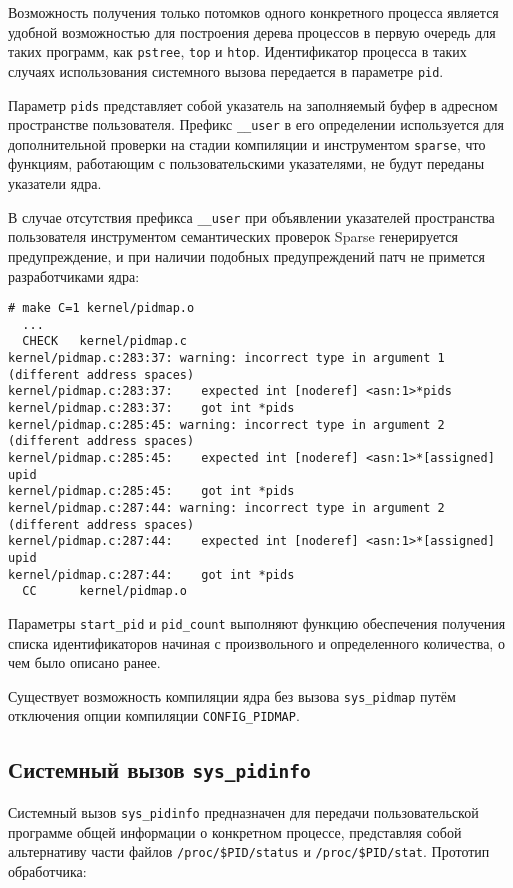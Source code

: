 Возможность получения только потомков одного конкретного процесса является
удобной возможностью для построения дерева процессов в первую очередь для таких
программ, как \texttt{pstree}, \texttt{top} и \texttt{htop}. Идентификатор
процесса в таких случаях использования системного вызова передается в параметре
\texttt{pid}.

Параметр \texttt{pids} представляет собой указатель на заполняемый буфер в
адресном пространстве пользователя. Префикс \texttt{\_\_user} в его определении
используется для дополнительной проверки на стадии компиляции и инструментом
\texttt{sparse}, что функциям, работающим с пользовательскими указателями, не
будут переданы указатели ядра.

В случае отсутствия префикса \texttt{\_\_user} при объявлении указателей
пространства пользователя инструментом семантических проверок Sparse
генерируется предупреждение, и при наличии подобных предупреждений патч не
примется разработчиками ядра:

\medskip
\begin{lstlisting}[style=cstyle]
# make C=1 kernel/pidmap.o
  ...
  CHECK   kernel/pidmap.c
kernel/pidmap.c:283:37: warning: incorrect type in argument 1 (different address spaces)
kernel/pidmap.c:283:37:    expected int [noderef] <asn:1>*pids
kernel/pidmap.c:283:37:    got int *pids
kernel/pidmap.c:285:45: warning: incorrect type in argument 2 (different address spaces)
kernel/pidmap.c:285:45:    expected int [noderef] <asn:1>*[assigned] upid
kernel/pidmap.c:285:45:    got int *pids
kernel/pidmap.c:287:44: warning: incorrect type in argument 2 (different address spaces)
kernel/pidmap.c:287:44:    expected int [noderef] <asn:1>*[assigned] upid
kernel/pidmap.c:287:44:    got int *pids
  CC      kernel/pidmap.o
\end{lstlisting}
\medskip

Параметры \texttt{start\_pid} и \texttt{pid\_count} выполняют функцию обеспечения
получения списка идентификаторов начиная с произвольного и определенного
количества, о чем было описано ранее.

Существует возможность компиляции ядра без вызова \texttt{sys\_pidmap} путём
отключения опции компиляции \texttt{CONFIG\_PIDMAP}.

\subsection{Системный вызов \texttt{sys\_pidinfo}}

Системный вызов \texttt{sys\_pidinfo} предназначен для передачи пользовательской
программе общей информации о конкретном процессе, представляя собой альтернативу
части файлов \texttt{/proc/\$PID/status} и \texttt{/proc/\$PID/stat}. Прототип
обработчика:

